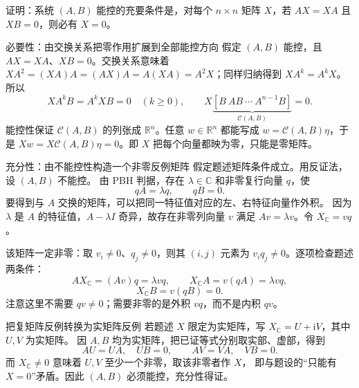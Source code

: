 \documentclass[11pt]{article}
\begin{document}
\begin{problem}[原题 11]
证明：系统 $(A,B)$ 能控的充要条件是，对每个 $n\times n$ 矩阵 $X$，若 $AX=XA$ 且 $XB=0$，则必有 $X=0$。
\end{problem}
\begin{solution}
\begin{proofstep}{必要性：由交换关系把零作用扩展到全部能控方向}
假定 $(A,B)$ 能控，且 $AX=XA$、$XB=0$。交换关系意味着
$XA^2=(XA)A=(AX)A=A(XA)=A^2X$；同样归纳得到
$XA^k=A^kX$。所以
\[
XA^kB=A^kXB=0\quad(k\ge0),\qquad
X\underbrace{[B\ AB\ \cdots\ A^{n-1}B]}_{\mathcal C(A,B)}=0.
\]
能控性保证 $\mathcal C(A,B)$ 的列张成 $\mathbb R^n$。任意 $w\in\mathbb R^n$
都能写成 $w=\mathcal C(A,B)\eta$，于是
$Xw=X\mathcal C(A,B)\eta=0$。即 $X$ 把每个向量都映为零，只能是零矩阵。
\end{proofstep}

\pagebreak
\begin{proofstep}{充分性：由不能控性构造一个非零反例矩阵}
假定题述矩阵条件成立。用反证法，设 $(A,B)$ 不能控。
由 PBH 判据，存在 $\lambda\in\mathbb C$ 和非零复行向量 $q$，使
\[
qA=\lambda q,\qquad qB=0.
\]
要得到与 $A$ 交换的矩阵，可以把同一特征值对应的左、右特征向量作外积。
因为 $\lambda$ 是 $A$ 的特征值，$A-\lambda I$ 奇异，故存在非零列向量 $v$ 满足
$Av=\lambda v$。令 $X_{\mathbb C}=vq$。

该矩阵一定非零：取 $v_i\ne0$、$q_j\ne0$，则其 $(i,j)$ 元素为
$v_iq_j\ne0$。逐项检查题述两条件：
\[
AX_{\mathbb C}=(Av)q=\lambda vq,
\qquad X_{\mathbb C}A=v(qA)=\lambda vq,
\]
\[
X_{\mathbb C}B=v(qB)=0.
\]
注意这里不需要 $qv\ne0$；需要非零的是外积 $vq$，而不是内积 $qv$。
\end{proofstep}

\begin{proofstep}{把复矩阵反例转换为实矩阵反例}
若题述 $X$ 限定为实矩阵，写 $X_{\mathbb C}=U+\mathrm i V$，其中 $U,V$ 为实矩阵。
因 $A,B$ 均为实矩阵，把已证等式分别取实部、虚部，得到
\[
AU=UA,\quad UB=0,\qquad AV=VA,\quad VB=0.
\]
而 $X_{\mathbb C}\ne0$ 意味着 $U,V$ 至少一个非零，取该非零者作 $X$，
即与题设的“只能有 $X=0$”矛盾。因此 $(A,B)$ 必须能控，充分性得证。
\end{proofstep}
\end{solution}
\end{document}
